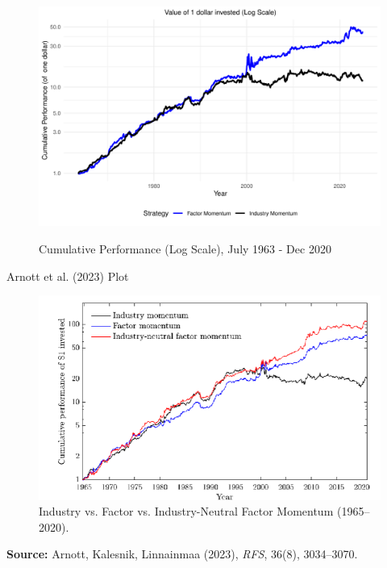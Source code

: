 \documentclass[t]{beamer}
\makeatletter
\def\maxwidth{%
  \ifdim\Gin@nat@width>\linewidth
    \linewidth
  \else
    \Gin@nat@width
  \fi
}
\newenvironment{knitrout}{}{}
\makeatother
\begin{document}
\begin{frame}
\begin{knitrout}
\color{fgcolor}
\begin{figure}
{\centering \includegraphics[width=\maxwidth]{figure/cum_ret_plot-1} }
\caption[Cumulative Performance (Log Scale), July 1963 - Dec 2020]{Cumulative Performance (Log Scale), July 1963 - Dec 2020}
\label{fig:cum_ret_plot}
\end{figure}
\end{knitrout}
\end{frame}

\begin{frame}{Arnott et al. (2023) Plot}
\begin{figure}[ht]
    \centering
    \includegraphics[width=0.92\linewidth]{Actual_plot.png}
    \caption{Industry vs. Factor vs. Industry-Neutral Factor Momentum (1965–2020).}
\end{figure}
\footnotesize
\textbf{Source:} Arnott, Kalesnik, Linnainmaa (2023), \textit{RFS}, 36(8), 3034–3070.
\end{frame}
\end{document}
